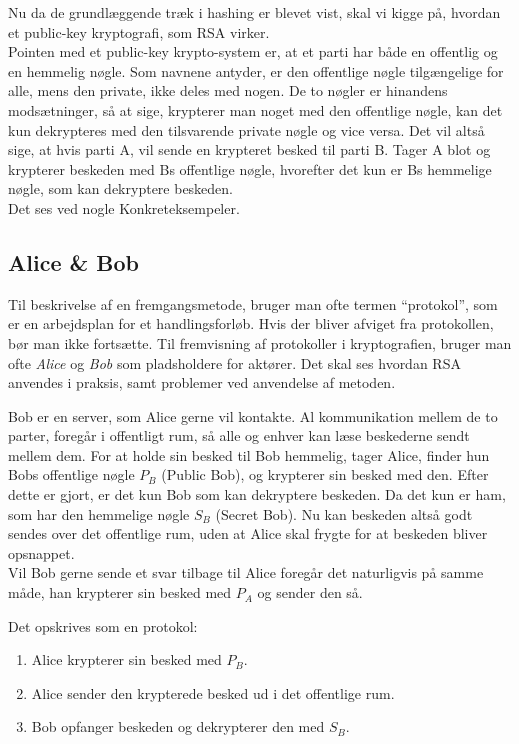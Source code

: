 Nu da de grundlæggende træk i hashing er blevet vist, skal vi kigge på, hvordan et public-key kryptografi, som RSA virker.\\
Pointen med et public-key krypto-system er, at et parti har både en offentlig og en hemmelig nøgle.
Som navnene antyder, er den offentlige nøgle tilgængelige for alle, mens den private, ikke deles med nogen.
De to nøgler er hinandens modsætninger, så at sige, krypterer man noget med den offentlige nøgle, kan det kun dekrypteres med den tilsvarende private nøgle og vice versa.
Det vil altså sige, at hvis parti A, vil sende en krypteret besked til parti B. Tager A blot og krypterer beskeden med Bs offentlige nøgle, hvorefter det kun er Bs hemmelige nøgle, som kan dekryptere beskeden.\\
Det ses ved nogle Konkreteksempeler.

\subsection{Alice \& Bob}
Til beskrivelse af en fremgangsmetode, bruger man ofte termen ``protokol'', som er en arbejdsplan for et handlingsforløb.
Hvis der bliver afviget fra protokollen, bør man ikke fortsætte.
Til fremvisning af protokoller i kryptografien, bruger man ofte \emph{Alice} og \emph{Bob} som pladsholdere for aktører.
Det skal ses hvordan RSA anvendes i praksis, samt problemer ved anvendelse af metoden.

\begin{eks}
    \label{genrsa}
    Bob er en server, som Alice gerne vil kontakte.
    Al kommunikation mellem de to parter, foregår i offentligt rum, så alle og enhver kan læse beskederne sendt mellem dem.
    For at holde sin besked til Bob hemmelig, tager Alice, finder hun Bobs offentlige nøgle \(P_B\) (Public Bob), og krypterer sin besked med den.
    Efter dette er gjort, er det kun Bob som kan dekryptere beskeden. Da det kun er ham, som har den hemmelige nøgle \(S_B\) (Secret Bob).
    Nu kan beskeden altså godt sendes over det offentlige rum, uden at Alice skal frygte for at beskeden bliver opsnappet.\\
    Vil Bob gerne sende et svar tilbage til Alice foregår det naturligvis på samme måde, han krypterer sin besked med \(P_A\) og sender den så.
    \par
    Det opskrives som en protokol:
    \begin{enumerate}[label*=(\arabic*)]%
        \item Alice krypterer sin besked med \(P_B\).
        \item Alice sender den krypterede besked ud i det offentlige rum.
        \item Bob opfanger beskeden og dekrypterer den med \(S_B\).
    \end{enumerate}
\end{eks}

